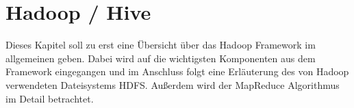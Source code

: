 \newpage
\section{Hadoop / Hive}
Dieses Kapitel soll zu erst eine Übersicht über das Hadoop Framework im allgemeinen geben. Dabei wird auf die wichtigsten Komponenten aus dem Framework eingegangen und im Anschluss folgt eine Erläuterung des von Hadoop verwendeten Dateisystems HDFS. Außerdem wird der MapReduce Algorithmus im Detail betrachtet.









